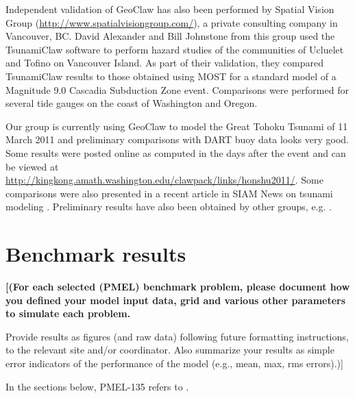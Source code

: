\documentclass[11pt]{article}
\newcommand{\todo}[1]{{\bf \color{blue} [#1]}}
\begin{document}
Independent validation of GeoClaw has also been performed by Spatial Vision
Group (\url{http://www.spatialvisiongroup.com/}), a private consulting
company in Vancouver, BC. David Alexander and Bill Johnstone from this group
used the  TsunamiClaw software to perform hazard
studies of the communities of Ucluelet and Tofino on Vancouver Island.  As
part of their validation, they compared  TsunamiClaw results to those obtained
using MOST for a standard model of a Magnitude 9.0 
Cascadia Subduction Zone event.  Comparisons were performed for several tide
gauges on the coast of Washington and Oregon.

Our group is currently using GeoClaw to model the Great Tohoku Tsunami of 11
March 2011 and preliminary comparisons with DART buoy data looks very good.
Some results were posted online as computed in the days after the event and
can be viewed at
\url{http://kingkong.amath.washington.edu/clawpack/links/honshu2011/}.
Some comparisons were also presented in a recent article in SIAM News on tsunami
modeling \cite{siamnews-tsunami}.  Preliminary results have also been
obtained by other groups, e.g. \cite{ZhangYuenEtal:2011}.


\section{Benchmark results}
\todo{(For each selected (PMEL) benchmark problem, please document how you defined
your model input data, grid and various other parameters to simulate each
problem. 

Provide results as figures (and raw data) following future formatting
instructions, to the relevant site and/or coordinator. Also summarize your
results as simple error indicators of the performance of the model (e.g.,
mean, max, rms errors).)}

In the sections below,
PMEL-135 refers to \cite{SynolakisBernard:pmel135}.

















\end{document}
